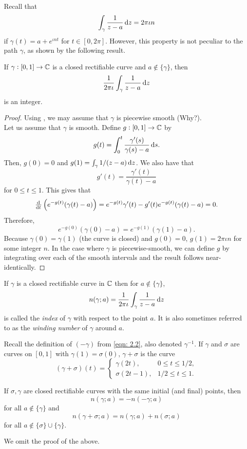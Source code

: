 	Recall that
	\[ \int_\gamma \frac{1}{z-a} \dif z  = 2 \pi \iota n \]
	if $\gamma(t) = a + e^{\iota n t}$ for $t \in [0,2\pi]$. However, this property is not peculiar to the path $\gamma$, as shown by the following result.

	\begin{ftheo}
		If $\gamma : [0,1] \to \mathbb{C}$ is a closed rectifiable curve and $a \not\in \{\gamma\}$, then
		\[ \frac{1}{2\pi\iota} \int_\gamma \frac{1}{z-a} \dif z \]
		is an integer.
	\end{ftheo}
	\begin{proof}
		Using , we may assume that $\gamma$ is piecewise smooth (Why?). \\
		Let us assume that $\gamma$ is smooth.
		Define $g : [0,1] \to \mathbb{C}$ by
		\[ g(t) = \int_0^t \frac{\gamma'(s)}{\gamma(s) - a} \dif s. \]
		Then, $g(0) = 0$ and $g(1) = \int_\gamma 1/(z-a) \dif z$. We also have that
		\[ g'(t) = \frac{\gamma'(t)}{\gamma(t) - a} \]
		for $0 \le t \le 1$. This gives that
		\[ \od{}{t} \left(e^{-g(t)}(\gamma(t) - a)\right) = e^{-g(t)} \gamma'(t) - g'(t) e^{-g(t)} (\gamma(t)-a) = 0. \]
		Therefore,
		\[ e^{-g(0)} (\gamma(0) - a) = e^{-g(1)} (\gamma(1) - a). \]
		Because $\gamma(0) = \gamma(1)$ (the curve is closed) and $g(0) = 0$, $g(1) = 2\pi\iota n$ for some integer $n$.
		In the case where $\gamma$ is piecewise-smooth, we can define $g$ by integrating over each of the smooth intervals and the result follows near-identically.
	\end{proof}

	\begin{fdef}
		If $\gamma$ is a closed rectifiable curve in $\mathbb{C}$ then for $a \not\in \{\gamma\}$,
		\[ n(\gamma;a) = \frac{1}{2\pi\iota} \int_\gamma \frac{1}{z-a} \dif z \]
		is called the \emph{index} of $\gamma$ with respect to the point $a$. It is also sometimes referred to as the \emph{winding number} of $\gamma$ around $a$.
	\end{fdef}
	Recall the definition of $(-\gamma)$ from \eqref{eqn: 2.2}, also denoted $\gamma^{-1}$. If $\gamma$ and $\sigma$ are curves on $[0,1]$ with $\gamma(1) = \sigma(0)$, $\gamma+\sigma$ is the curve
	\[ (\gamma+\sigma)(t) = \begin{cases} \gamma(2t), & 0 \le t \le 1/2, \\ \sigma(2t-1), & 1/2 \le t \le 1. \end{cases} \]

	\begin{prop}
		If $\sigma,\gamma$ are closed rectifiable curves with the same initial (and final) points, then
		\begin{equation}
			n(\gamma;a) = -n(-\gamma;a)
		\end{equation}
		for all $a \not\in \{\gamma\}$ and
		\begin{equation}
			n(\gamma+\sigma;a) = n(\gamma;a) + n(\sigma;a)
		\end{equation}
		for all $a \not\in \{\sigma\} \cup \{\gamma\}$.
	\end{prop}
	We omit the proof of the above.\\

